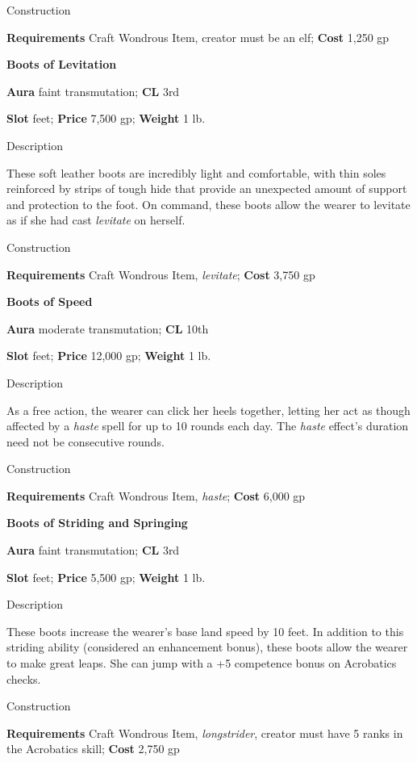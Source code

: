 Construction
				
\textbf{Requirements} Craft Wondrous Item, creator must be an elf; \textbf{Cost }1,250 gp
				
\textbf{Boots of Levitation}
				
\textbf{Aura} faint transmutation;\textbf{ CL }3rd
				
\textbf{Slot} feet; \textbf{Price} 7,500 gp; \textbf{Weight} 1 lb.
				
Description
				
These soft leather boots are incredibly light and comfortable, with thin soles reinforced by strips of tough hide that provide an unexpected amount of support and protection to the foot. On command, these boots allow the wearer to levitate as if she had cast \textit{levitate }on herself. 
				
Construction
				
\textbf{Requirements} Craft Wondrous Item, \textit{levitate}; \textbf{Cost }3,750 gp
				
\textbf{Boots of Speed}
				
\textbf{Aura} moderate transmutation;\textbf{ CL }10th
				
\textbf{Slot} feet; \textbf{Price} 12,000 gp; \textbf{Weight} 1 lb.
				
Description
				
As a free action, the wearer can click her heels together, letting her act as though affected by a \textit{haste }spell for up to 10 rounds each day. The \textit{haste }effect's duration need not be consecutive rounds. 
				
Construction
				
\textbf{Requirements} Craft Wondrous Item, \textit{haste}; \textbf{Cost }6,000 gp
				
\textbf{Boots of Striding and Springing}
				
\textbf{Aura} faint transmutation;\textbf{ CL }3rd
				
\textbf{Slot} feet; \textbf{Price} 5,500 gp; \textbf{Weight} 1 lb.
				
Description
				
These boots increase the wearer's base land speed by 10 feet. In addition to this striding ability (considered an enhancement bonus), these boots allow the wearer to make great leaps. She can jump with a +5 competence bonus on Acrobatics checks. 
				
Construction
				
\textbf{Requirements} Craft Wondrous Item, \textit{longstrider}, creator must have 5 ranks in the Acrobatics skill; \textbf{Cost }2,750 gp
				
